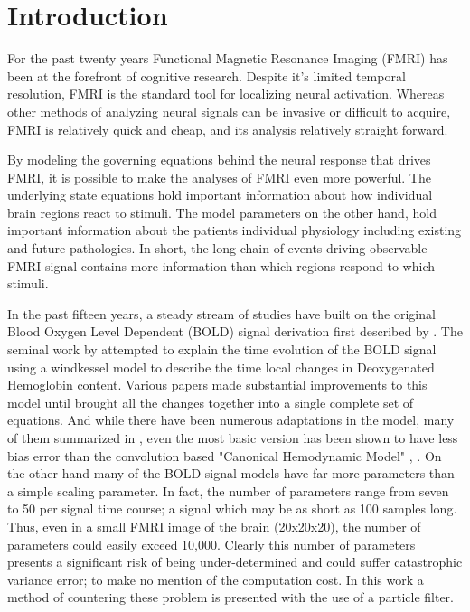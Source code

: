\chapter{Introduction}
For the past twenty years Functional Magnetic Resonance Imaging (FMRI) 
has been at the forefront of cognitive research. Despite it's
limited temporal resolution, FMRI is the standard tool for localizing 
neural activation.  Whereas other methods
of analyzing neural signals can be invasive or difficult to acquire, 
FMRI is relatively quick and cheap, and its analysis relatively straight forward.

By modeling the governing equations behind the neural response that
drives FMRI, it is possible to make the analyses of FMRI even more
powerful. The underlying state equations hold important information
about how individual brain regions react to stimuli. The model parameters
on the other hand, hold important information about the patients individual
physiology including existing and future pathologies. In short,
the long chain of events driving observable FMRI signal contains more
information than which regions respond to which stimuli.

In the past fifteen years, a steady stream of studies have built
on the original Blood Oxygen Level Dependent (BOLD) signal 
derivation first described by \cite{Ogawa}.
The seminal work by \cite{Buxton1998} attempted to explain the
time evolution of the BOLD signal using a windkessel model to
describe the time local changes in Deoxygenated Hemoglobin content.
Various papers made substantial improvements to this model until
\cite{Buxton2004} brought all the changes together into a single complete 
set of equations. And while there have been numerous adaptations in the model, 
many of them summarized in \cite{Deneux2006}, even the most basic version
has been shown to have less bias error than the convolution based 
"Canonical Hemodynamic Model" \cite{Deneux2006}, \cite{Handwerker2004}.
On the other hand many of the BOLD signal models have far more parameters
than a simple scaling parameter. In fact, the number of parameters
range from seven \cite{Riera2004} to 50 \cite{Behzadi2005} per
signal time course; a signal which may be as short as 100 samples long.
Thus, even in a small FMRI image of the brain (20x20x20), the number of parameters 
could easily exceed 10,000. Clearly this number of parameters presents
a significant risk of being under-determined and could suffer catastrophic
variance error; to make no mention of the computation cost. 
In this work a method of countering these problem is presented
with the use of a particle filter.

